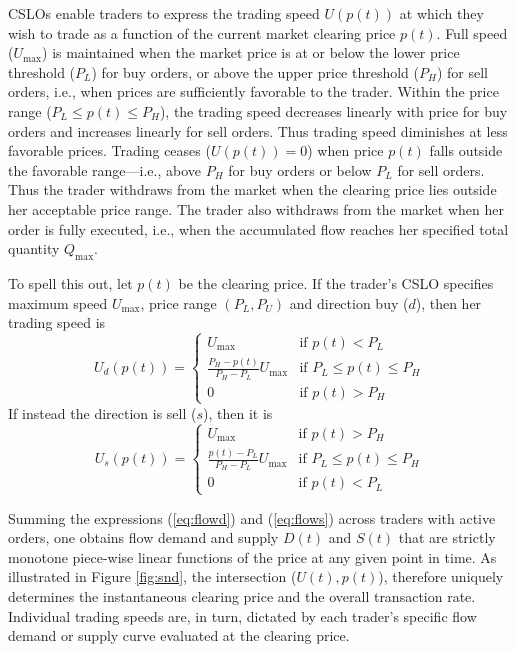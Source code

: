 \documentclass[12pt]{article}
\begin{document}
CSLOs enable traders to express the trading speed \(U(p(t))\) at which they wish to trade as a function of the current market clearing price \(p(t)\). 
Full speed (\(U_{\max}\)) is maintained when the market price is at or below the lower price threshold (\(P_L\)) for buy orders, or above the upper price threshold (\(P_H\)) for sell orders, i.e., when prices are sufficiently favorable to the trader.
Within the price range (\(P_L \leq p(t) \leq P_H\)), the trading speed decreases linearly with price for buy orders and increases linearly for sell orders. Thus trading speed diminishes at less favorable prices. 
Trading ceases (\(U(p(t)) = 0\)) when price $p(t)$ falls outside the favorable range—i.e., above \(P_H\) for buy orders or below \(P_L\) for sell orders. Thus the trader withdraws from the market when the clearing price lies outside her acceptable price range. 
The trader also withdraws from the market when her order is fully executed, i.e., when the accumulated flow reaches her specified total quantity \(Q_{\max}\).

To spell this out, let $p(t)$ be the clearing price. If the trader's CSLO specifies maximum speed $U_{\max}$, price range $(P_L , P_U)$ and direction buy ($d$), then her trading speed is
\begin{equation}\label{eq:flowd}
U_{d}(p(t)) = \begin{cases}
U_{\max} & \text{if } p(t) < P_L \\
\frac{P_H - p(t)}{P_H - P_L} U_{\max} & \text{if } P_L \leq p(t) \leq P_H \\
0 & \text{if } p(t) > P_H
\end{cases}
\end{equation}
If instead the direction is sell ($s$),
then it is
\begin{equation}\label{eq:flows}
U_s(p(t)) = \begin{cases}
	U_{\max} & \text{if } p(t) > P_H\\
	\frac{p(t) - P_L}{P_H - P_L} U_{\max} & \text{if } P_L \leq p(t) \leq P_H \\
	0 & \text{if } p(t) < P_L 
\end{cases}
\end{equation}

Summing the expressions (\ref{eq:flowd}) and (\ref{eq:flows})
across traders with active orders, one obtains flow demand and supply $D(t)$ and $S(t)$ that are strictly monotone piece-wise linear functions of the price at any given point in time. 
As illustrated in Figure \ref{fig:snd}, the 
intersection ($U(t), p(t)$), therefore uniquely determines the instantaneous clearing price and the overall transaction rate.
 Individual trading speeds are, in turn, dictated by each trader's specific flow demand or supply curve evaluated at the clearing price. 
\end{document}
